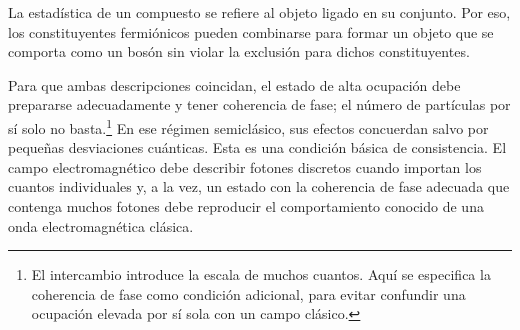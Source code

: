 La estadística de un compuesto se refiere al objeto ligado en su conjunto. Por eso, los constituyentes fermiónicos pueden combinarse para formar un objeto que se comporta como un bosón sin violar la exclusión para dichos constituyentes.

\begin{classroomqa}
\end{classroomqa}

Para que ambas descripciones coincidan, el estado de alta ocupación debe prepararse adecuadamente y tener coherencia de fase; el número de partículas por sí solo no basta.\footnote{El intercambio introduce la escala de muchos cuantos. Aquí se especifica la coherencia de fase como condición adicional, para evitar confundir una ocupación elevada por sí sola con un campo clásico.} En ese régimen semiclásico, sus efectos concuerdan salvo por pequeñas desviaciones cuánticas. Esta es una condición básica de consistencia. El campo electromagnético debe describir fotones discretos cuando importan los cuantos individuales y, a la vez, un estado con la coherencia de fase adecuada que contenga muchos fotones debe reproducir el comportamiento conocido de una onda electromagnética clásica.
